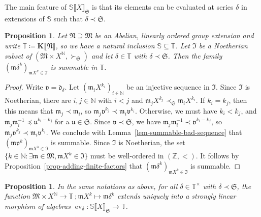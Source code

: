 \documentclass{article}
\newcommand{\assign}{\coloneqq}
\newcommand{\of}{:}
\newcommand{\suchthat}{:}
\newcommand{\tmop}[1]{\ensuremath{\operatorname{#1}}}
\newtheorem{proposition}[theorem]{Proposition}
\theoremstyle{remark}\newtheorem*{convention*}{Convention}
\begin{document}
The main feature of $\mathbb{S} \llbracket X \rrbracket_{\mathfrak{S}}$ is
that its elements can be evaluated at series $\delta$ in extensions of
$\mathbb{S}$ such that $\delta \prec \mathfrak{S}$.

\begin{proposition}
  \label{prop-cut-evaluation}Let $\mathfrak{N} \supseteq \mathfrak{M}$ be an
  Abelian, linearly ordered group extension and write $\mathbb{T} \assign
  \mathbf{K} \llbracket \mathfrak{N} \rrbracket$, so we have a natural
  inclusion $\mathbb{S} \subseteq \mathbb{T}$. Let $\mathfrak{I}$ be a
  Noetherian subset of $(\mathfrak{M} \times X^{\mathbb{N}},
  \succ_{\mathfrak{S}})$ and let $\delta \in \mathbb{T}$ with $\delta \prec
  \mathfrak{S}$. Then the family $(\mathfrak{m} \delta^k)_{\mathfrak{m}X^k \in
  \mathfrak{I}}$ is summable in $\mathbb{T}$.
\end{proposition}

\begin{proof}
  Write $\mathfrak{v}=\mathfrak{d}_{\delta}$. Let $(\mathfrak{m}_i X^{k_i})_{i
  \in \mathbb{N}}$ be an injective sequence in $\mathfrak{I}$. Since
  $\mathfrak{I}$ is Noetherian, there are $i, j \in \mathbb{N}$ with $i < j$
  and $\mathfrak{m}_j X^{k_j} \prec_{\mathfrak{S}} \mathfrak{m}_i X^{k_i}$. If
  $k_i = k_j$, then this means that $\mathfrak{m}_j \prec \mathfrak{m}_i$, so
  $\mathfrak{m}_j \mathfrak{v}^{k_j} \prec \mathfrak{m}_i \mathfrak{v}^{k_i}$.
  Otherwise, we must have $k_i < k_j$, and $\mathfrak{m}_j \mathfrak{m}_i^{-
  1} \preccurlyeq \mathfrak{u}^{k_i - k_j}$ for a $\mathfrak{u} \in
  \mathfrak{S}$. Since $\mathfrak{v} \prec \mathfrak{S}$, we have
  $\mathfrak{m}_j \mathfrak{m}_i^{- 1} \prec \mathfrak{v}^{k_i - k_j}$, so
  $\mathfrak{m}_j \mathfrak{v}^{k_j} \prec \mathfrak{m}_i \mathfrak{v}^{k_i}$.
  We conclude with Lemma~\ref{lem-summable-bad-sequence} that
  $(\mathfrak{m}\mathfrak{v}^k)_{\mathfrak{m}X^k \in \mathfrak{I}}$ is
  summable. Since $\mathfrak{I}$ is Noetherian, the set $\{k \in \mathbb{N}
  \suchthat \exists \mathfrak{m} \in \mathfrak{M}, \mathfrak{m}X^k \in
  \mathfrak{I}\}$ must be well-ordered in $(\mathbb{Z}, <)$. It follows by
  Proposition~\ref{prop-adding-finite-factors} that $(\mathfrak{m}
  \delta^k)_{\mathfrak{m}X^k \in \mathfrak{I}}$ is summable.
\end{proof}

\begin{proposition}
  \label{prop-Noeth-evaluation}In the same notations as above, for all $\delta
  \in \mathbb{T}^{\times}$ with $\delta \prec \mathfrak{S}$, the function
  $\mathfrak{M} \times X^{\mathbb{N}} \longrightarrow \mathbb{T} \: ;
  \mathfrak{m}X^k \mapsto \mathfrak{m} \delta^k$ extends uniquely into a
  strongly linear morphism of algebras $\tmop{ev}_{\delta} \of \mathbb{S}
  \llbracket X \rrbracket_{\mathfrak{S}} \longrightarrow \mathbb{T}$.
\end{proposition}
\end{document}

